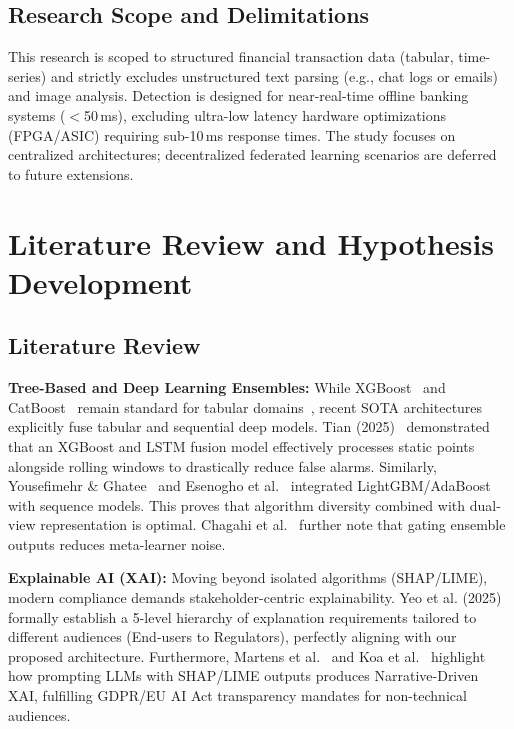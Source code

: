 \documentclass[10pt,a4paper,twocolumn]{article}
\begin{document}
\subsection{Research Scope and Delimitations}
This research is scoped to structured financial transaction data (tabular, time-series) and strictly excludes unstructured text parsing (e.g., chat logs or emails) and image analysis. Detection is designed for near-real-time offline banking systems ($<$50\,ms), excluding ultra-low latency hardware optimizations (FPGA/ASIC) requiring sub-10\,ms response times. The study focuses on centralized architectures; decentralized federated learning scenarios are deferred to future extensions.

\section{Literature Review and Hypothesis Development}
\subsection{Literature Review}
\textbf{Tree-Based and Deep Learning Ensembles:} While XGBoost~\cite{chen2016} and CatBoost~\cite{prokhorenkova2018} remain standard for tabular domains~\cite{grinsztajn2022}, recent SOTA architectures explicitly fuse tabular and sequential deep models. Tian (2025)~\cite{tian2025} demonstrated that an XGBoost and LSTM fusion model effectively processes static points alongside rolling windows to drastically reduce false alarms. Similarly, Yousefimehr \& Ghatee~\cite{yousefimehr2025} and Esenogho et al.~\cite{esenogho2022} integrated LightGBM/AdaBoost with sequence models. This proves that algorithm diversity combined with dual-view representation is optimal. Chagahi et al.~\cite{chagahi2025} further note that gating ensemble outputs reduces meta-learner noise.

\textbf{Explainable AI (XAI):} Moving beyond isolated algorithms (SHAP/LIME), modern compliance demands stakeholder-centric explainability. Yeo et al. (2025)~\cite{yeo2025} formally establish a 5-level hierarchy of explanation requirements tailored to different audiences (End-users to Regulators), perfectly aligning with our proposed architecture. Furthermore, Martens et al.~\cite{martens2025} and Koa et al.~\cite{koa2024} highlight how prompting LLMs with SHAP/LIME outputs produces Narrative-Driven XAI, fulfilling GDPR/EU AI Act transparency mandates for non-technical audiences.
\end{document}
